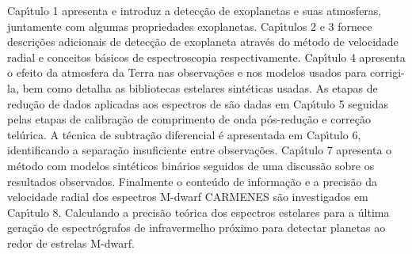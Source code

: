 \begin{abstract-pt}
     Cap\'{\i}tulo 1 apresenta e introduz a detec\c{c}\~{a}o de exoplanetas e suas atmosferas, juntamente com algumas propriedades exoplanetas.
     Cap\'{\i}tulos 2 e 3 fornece descri\c{c}\~{o}es adicionais de detec\c{c}\~{a}o de exoplaneta atrav\'{e}s do m\'{e}todo de velocidade radial e conceitos b\'{a}sicos de \nir{} espectroscopia respectivamente.
     Cap\'{\i}tulo 4 apresenta o efeito da atmosfera da Terra nas observa\c{c}\~{o}es e nos modelos usados para corrigi-la, bem como detalha as bibliotecas estelares sint\'{e}ticas usadas.
     As etapas de redu\c{c}\~{a}o de dados aplicadas aos espectros de \nir{} s\~{a}o dadas em Cap\'{\i}tulo 5 seguidas pelas etapas de calibra\c{c}\~{a}o de comprimento de onda p\'{o}s-redu\c{c}\~{a}o e corre\c{c}\~{a}o tel\'{u}rica.
     A t\'{e}cnica de subtra\c{c}\~{a}o diferencial \'{e} apresentada em Cap\'{\i}tulo 6, identificando a separa\c{c}\~{a}o insuficiente entre observa\c{c}\~{o}es.
     Cap\'{\i}tulo 7 apresenta o m\'{e}todo \textchisquared{} com modelos sint\'{e}ticos bin\'{a}rios seguidos de uma discuss\~{a}o sobre os resultados observados.
     Finalmente o \nir{} conte\'{u}do de informa\c{c}\~{a}o e a precis\~{a}o da velocidade radial dos espectros {M-dwarf} {CARMENES} s\~{a}o investigados em Cap\'{\i}tulo 8.
     Calculando a precis\~{a}o te\'{o}rica dos espectros estelares para a \'{u}ltima gera\c{c}\~{a}o de espectr\'{o}grafos de infravermelho pr\'{o}ximo para detectar planetas ao redor de estrelas {M-dwarf}.
\end{abstract-pt}
